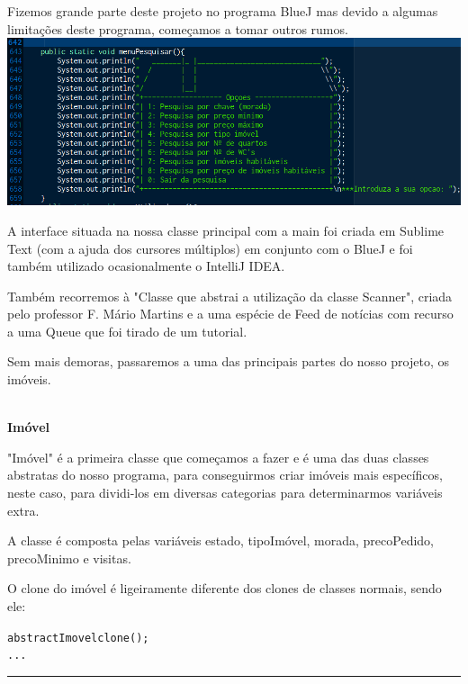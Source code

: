 \documentclass[12pt]{article}
\newenvironment{code}                    
{\textbf{
} \hspace{1cm} \hrulefill \\ 
\smallskip 
\begin{center}
\begin{minipage}{0.9\textwidth} 
\begin{alltt}\small}
{\end{alltt}
\end{minipage}
\end{center}
\hrule\smallskip
}
\begin{document}
Fizemos grande parte deste projeto no programa BlueJ mas devido a algumas limitações deste programa, começamos a tomar outros rumos.
\newline
\newline
\includegraphics[scale=0.4]{002.png}	 
\newline
\newline

A interface situada na nossa classe principal com a main foi criada em Sublime Text (com a ajuda dos cursores múltiplos) em conjunto com o BlueJ e foi também utilizado ocasionalmente o IntelliJ IDEA.
\newline

Também recorremos à "Classe que abstrai a utilização da classe Scanner", criada pelo professor F. Mário Martins e a uma espécie de Feed de notícias com recurso a uma Queue que foi tirado de um tutorial.
\newline
\newline

Sem mais demoras, passaremos a uma das principais partes do nosso projeto, os imóveis.

\pagebreak

\textbf{\\Imóvel}
\newline

"Imóvel" é a primeira classe que começamos a fazer e é uma das duas classes abstratas do nosso programa, para conseguirmos criar imóveis mais específicos, neste caso, para dividi-los em diversas categorias para determinarmos variáveis extra. 
\newline

A classe é composta pelas variáveis estado, tipoImóvel, morada, precoPedido, precoMinimo e visitas. 
\newline

O clone do imóvel é ligeiramente diferente dos clones de classes normais, sendo ele:
\newline
\begin{code}
 abstract Imovel clone();
...
\end{code}
~\\
\end{document}
